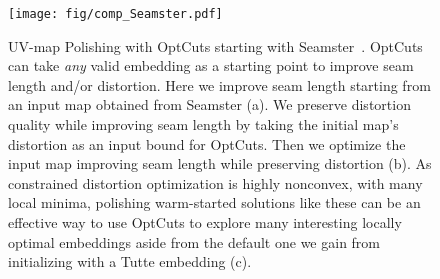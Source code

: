 %
%


\begin{figure}[t]
\centering
\texttt{[image: fig/comp\_Seamster.pdf]}
\vspace{-0.3cm}
\caption{UV-map Polishing with OptCuts starting with Seamster~\cite{Sheffer2002Seamster}. OptCuts can take \emph{any} valid embedding as a starting point to improve seam length and/or distortion. Here we improve seam length starting from an input map obtained from Seamster (a). We preserve distortion quality while improving seam length by taking the initial map's distortion as an input bound for OptCuts. Then we optimize the input map improving seam length while preserving distortion (b). As constrained distortion optimization is highly nonconvex, with many local minima, polishing warm-started solutions like these can be an effective way to use OptCuts to explore many interesting locally optimal embeddings aside from the default one we gain from initializing with a Tutte embedding (c).}
\vspace{-0.3cm}
\label{fig:comp_Seamster}
\end{figure}

